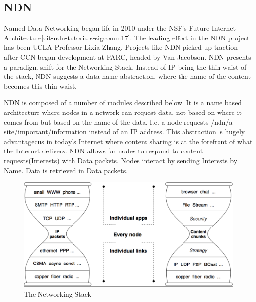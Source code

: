 \subsection{NDN}
Named Data Networking began life in 2010 under the NSF's Future Internet Architecture[cit-ndn-tutorials-sigcomm17]. The leading effort in the NDN project has been UCLA Professor Lixia Zhang. Projects like NDN picked up traction after CCN began development at PARC, headed by Van Jacobson. NDN presents a paradigm shift for the Networking Stack. Instead of IP being the thin-waist of the stack, NDN suggests a data name abstraction, where the name of the content becomes this thin-waist. \par
NDN is composed of a number of modules described below. It is a name based architecture where nodes in a network can request data, not based on where it comes from but based on the name of the data. I.e. a node requests /ndn/a-site/important/information instead of an IP address. This abstraction is hugely advantageous in today's Internet where content sharing is at the forefront of what the Internet delivers. NDN allows for nodes to respond to content requests(Interests) with Data packets. Nodes interact by sending Interests by Name. Data is retrieved in Data packets.\par 
\vfill
\begin{figure}
\includegraphics[width=6in]{hourglass.png}
\caption{The Networking Stack}
\end{figure}
